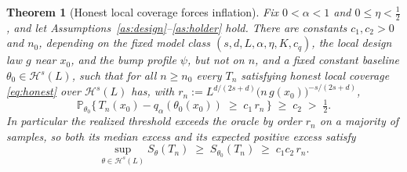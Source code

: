 \documentclass[11pt]{article}
\newtheorem{theorem}{Theorem}
\theoremstyle{definition}
\theoremstyle{remark}
\newcommand{\Prob}{\mathbb{P}}
\newcommand{\Hs}[1][s]{\mathcal{H}^{#1}}
\begin{document}
\begin{theorem}[Honest local coverage forces inflation]\label{thm:main}
Fix $0<\alpha<1$ and $0 \le \eta < \tfrac12$, and let
Assumptions~\ref{as:design}--\ref{as:holder} hold. There are constants $c_1,c_2>0$ and
$n_0$, depending on the fixed model class $(s,d,L,\alpha,\eta,K,c_q)$, the local design law
$g$ near $x_0$, and the bump profile $\psi$, but not on $n$, and a fixed constant baseline
$\theta_0\in\Hs(L)$, such that for all $n\ge n_0$ every $T_n$ satisfying
honest local coverage \eqref{eq:honest} over $\Hs(L)$ has, with
$r_n := L^{d/(2s+d)}\big(n\,g(x_0)\big)^{-s/(2s+d)}$,
\begin{equation}\label{eq:tail}
  \Prob_{\theta_0}\big\{\, T_n(x_0) - q_\alpha(\theta_0(x_0)) \;\ge\; c_1\,r_n \,\big\}
  \;\ge\; c_2 \;>\; \tfrac12 .
\end{equation}
In particular the realized threshold exceeds the oracle by order $r_n$ on a majority of
samples, so both its median excess and its expected positive excess satisfy
\begin{equation}\label{eq:rate}
  \sup_{\theta \in \Hs(L)} S_\theta(T_n)
  \;\ge\; S_{\theta_0}(T_n) \;\ge\; c_1 c_2\, r_n .
\end{equation}
\end{theorem}
\end{document}
